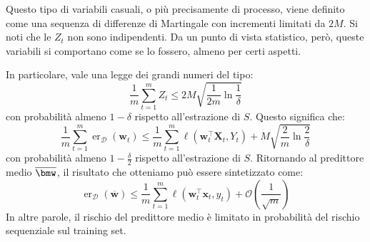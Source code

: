 \documentclass[\main/main.tex]{subfiles}
\begin{document}
\begin{analysis}
\begin{multicols}{2}
        Questo tipo di variabili casuali, o più precisamente di processo, viene definito come una sequenza di differenze di Martingale con incrementi limitati da \(2M\). Si noti che le \(Z_t\) non sono indipendenti. Da un punto di vista statistico, però, queste variabili si comportano come se lo fossero, almeno per certi aspetti.
        
        In particolare, vale una legge dei grandi numeri del tipo:
        \[\frac{1}{m} \sum_{t=1}^{m} Z_{t} \leq 2 M \sqrt{\frac{1}{2 m} \ln \frac{1}{\delta}}\]
        con probabilità almeno \(1-\delta\) rispetto all'estrazione di \(S\). Questo significa che:
        \[\frac{1}{m} \sum_{t=1}^{m} \operatorname{er}_{\mathcal{D}}\left(\boldsymbol{w}_{t}\right) \leq \frac{1}{m} \sum_{t=1}^{m} \ell\left(\boldsymbol{w}_{t}^{\top} \boldsymbol{X}_{t}, Y_{t}\right)+M \sqrt{\frac{2}{m} \ln \frac{2}{\delta}}\]
        con probabilità almeno \(1-\frac{\delta}{2}\) rispetto all'estrazione di \(S\). Ritornando al predittore medio \(\bar{\bmw}\), il risultato che otteniamo può essere sintetizzato come:
        \[\operatorname{er}_{\mathcal{D}}(\overline{\boldsymbol{w}}) \leq \frac{1}{m} \sum_{t=1}^{m} \ell\left(\boldsymbol{w}_{t}^{\top} \boldsymbol{x}_{t}, y_{t}\right)+\mathcal{O}\left(\frac{1}{\sqrt{m}}\right)\]
        In altre parole, il rischio del predittore medio è limitato in probabilità del rischio sequenziale sul training set.
    \end{multicols}
\end{analysis}
\end{document}
